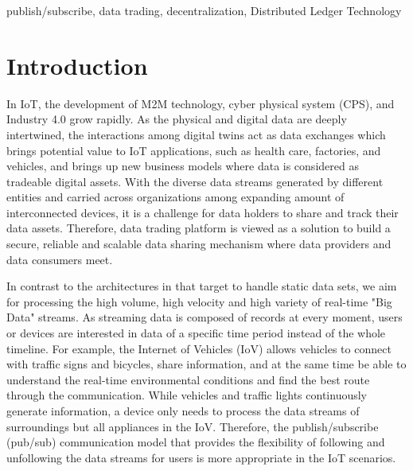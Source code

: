 \documentclass[conference]{IEEEtran}
\begin{document}
\begin{IEEEkeywords}
publish/subscribe, data trading, decentralization, Distributed Ledger Technology
\end{IEEEkeywords}

\section{Introduction}
In IoT, the development of M2M technology\cite{M2M}, cyber physical system (CPS)\cite{CPS}, and Industry 4.0 grow rapidly. As the physical and digital data are deeply intertwined, the interactions among digital twins act as data exchanges\cite{digitaltwin} which brings potential value to IoT applications, such as health care\cite{healthCare}, factories, and vehicles\cite{AutonomousDriving}, and brings up new business models where data is considered as tradeable digital assets. With the diverse data streams generated by different entities and carried across organizations among expanding amount of interconnected devices, it is a challenge for data holders to share and track their data assets. Therefore, data trading platform is viewed as a solution to build a secure, reliable and scalable data sharing mechanism where data providers and data consumers meet.

In contrast to the architectures in \cite{DIaas, MARSA} that target to handle static data sets, we aim for processing the high volume, high velocity and high variety of real-time "Big Data" streams\cite{BigData}. As streaming data is composed of records at every moment, users or devices are interested in data of a specific time period instead of the whole timeline. For example, the Internet of Vehicles (IoV) allows vehicles to connect with traffic signs and bicycles, share information, and at the same time be able to understand the real-time environmental conditions and find the best route through the communication. While vehicles and traffic lights continuously generate information, a device only needs to process the data streams of surroundings but all appliances in the IoV. Therefore, the publish/subscribe (pub/sub) communication model that provides the flexibility of following and unfollowing the data streams for users is more appropriate in the IoT scenarios.
\end{document}
